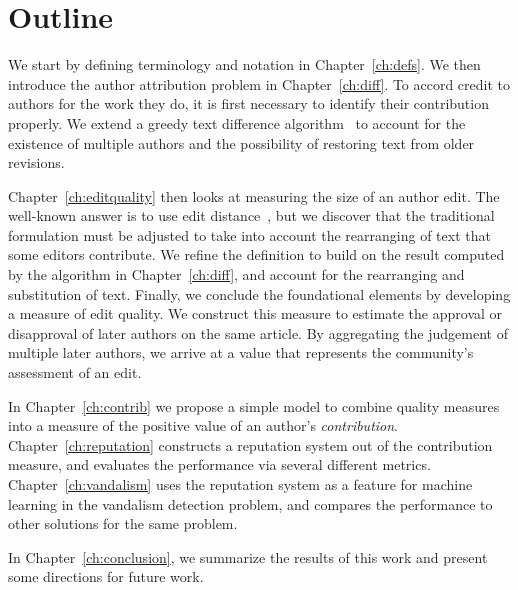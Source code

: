 \section{Outline}

We start by defining terminology and notation in Chapter~\ref{ch:defs}.
We then introduce the author attribution problem in Chapter~\ref{ch:diff}.
To accord credit to authors for the work they do,
it is first necessary to identify their contribution properly.
We extend a greedy text difference algorithm~\cite{Reichenberger1991,Burns1997} to
account for the existence of multiple authors and the possibility
of restoring text from older revisions.

Chapter~\ref{ch:editquality} then looks at measuring the size of
an author edit.
The well-known answer is to use edit distance~\cite{Levenshtein1966},
but we discover that the traditional formulation must be adjusted
to take into account the rearranging of text that some editors contribute.
We refine the definition to build on the result computed by the
algorithm in Chapter~\ref{ch:diff}, and account for the rearranging
and substitution of text.
Finally, we conclude the foundational elements by developing a measure
of edit quality.
We construct this measure to estimate the approval or disapproval of
later authors on the same article.
By aggregating the judgement of multiple later authors, we arrive at
a value that represents the community's assessment of an edit.

In Chapter~\ref{ch:contrib} we propose a simple model to combine
quality measures into a measure of the positive value of an author's \textit{contribution}.
Chapter~\ref{ch:reputation} constructs a reputation system
out of the contribution measure, and evaluates the performance
via several different metrics.
Chapter~\ref{ch:vandalism} uses the reputation system as a feature
for machine learning in the vandalism detection problem, and compares
the performance to other solutions for the same problem.

In Chapter~\ref{ch:conclusion}, we summarize the results of this work
and present some directions for future work.


